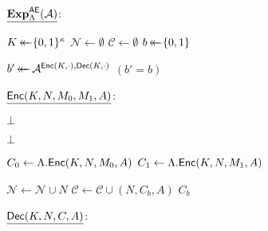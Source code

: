 \begin{figure}


\centering

\begin{adjustbox}{margin*=2ex,width=0.997\textwidth,frame,center}
	\begin{minipage}[t]{0.34\textwidth}
		$\underline{\mathbf{Exp}_{\Lambda}^{\mathsf{AE}}(\mathcal{A})}$: 
		\begin{algorithmic}[1]
			\State $K \operatorname{\leftarrow\mathrel{\mkern-14mu}\leftarrow} \lbrace 0, 1 \rbrace^\kappa$
			\State $\mathcal{N} \gets \emptyset$
			\State $\mathcal{C} \gets \emptyset$
			\State $b \operatorname{\leftarrow\mathrel{\mkern-14mu}\leftarrow} \lbrace 0, 1 \rbrace$

			\State
			\State $b' \operatorname{\leftarrow\mathrel{\mkern-14mu}\leftarrow} \mathcal{A}^{\mathsf{Enc}(K, \cdot),\mathsf{Dec}(K, \cdot)}$ 
			\State \Return $(b' = b)$
	

		\end{algorithmic}
	\end{minipage}
	
	\hspace*{0.5em}
	
	\begin{minipage}[t]{0.49\textwidth}		
		$\underline{\mathsf{Enc}(K, N, M_0, M_1, A)}$: 
		\begin{algorithmic}[1]
				\State \Return $\bot$
			\EndIf
			
			\State	
			\State {}	
				\State \Return $\bot$
			\EndIf
			
			
			
			\State
			\State $C_{0}\gets \Lambda.\mathsf{Enc}(K, N, M_0, A)$
			\State $C_{1}  \gets \Lambda.\mathsf{Enc}(K, N, M_1, A)$

			\State
			\State $\mathcal{N} \gets \mathcal{N} \cup N$
			\State $\mathcal{C} \gets \mathcal{C} \cup (N, C_{b}, A)$
			\State
			\State \Return $C_b$
	

		\end{algorithmic}
	\end{minipage}


	\begin{minipage}[t]{0.40\textwidth}		

		$\underline{\mathsf{Dec}(K, N, C, A)}$: 
		\begin{algorithmic}[1]


\end{algorithmic}
\end{minipage}
\end{adjustbox}
\end{figure}
